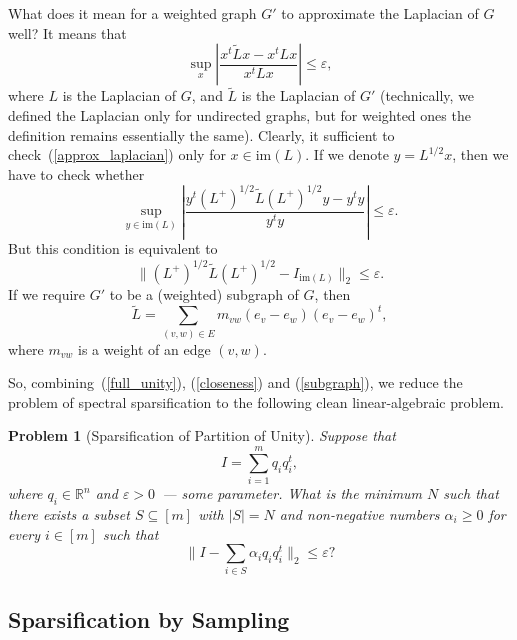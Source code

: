 \documentclass[12pt]{article}
\newcommand{\eps}{\varepsilon}
\newtheorem{problem}{Problem}
\begin{document}
    What does it mean for a weighted graph $G'$ to approximate the Laplacian of $G$ well?
    It means that
    \begin{equation}
        \label{approx_laplacian}
        \sup_x \left|\frac{x^t \tilde{L} x - x^t L x}{x^t L x}\right|\leq \eps,
    \end{equation}
    where $L$ is the Laplacian of $G$, and $\tilde{L}$ is the Laplacian of $G'$
    (technically, we defined the Laplacian only for undirected graphs, but for weighted
    ones the definition remains essentially the same).
    Clearly, it sufficient to check~(\ref{approx_laplacian}) only for
    $x \in \mathrm{im}(L)$.
    If we denote $y = L^{1/2} x$, then we have to check whether
    $$
        \sup_{y \in \mathrm{im}(L)} \left|\frac{y^t (L^+)^{1/2}
            \tilde{L} (L^+)^{1/2} y - y^t y}{y^t y}\right| \leq \eps.
    $$
    But this condition is equivalent to
    \begin{equation}
        \label{closeness}
        \|(L^+)^{1/2} \tilde{L} (L^+)^{1/2} - I_{\mathrm{im}(L)}\|_2 \leq \eps.
    \end{equation}
    If we require $G'$ to be a (weighted) subgraph of $G$, then
    \begin{equation}
        \label{subgraph}
        \tilde{L} = \sum_{(v,w)\in E} m_{vw} (e_v - e_w) (e_v - e_w)^t,
    \end{equation}
    where $m_{vw}$ is a weight of an edge $(v, w)$.

    So, combining~(\ref{full_unity}), (\ref{closeness}) and (\ref{subgraph}),
    we reduce the problem of spectral sparsification to the following clean
    linear-algebraic problem.

    \begin{problem}[Sparsification of Partition of Unity]
        \label{spu}
        Suppose that
        $$
            I = \sum_{i=1}^m q_i q_i^t,
        $$
        where $q_i \in \mathbb{R}^n$
        and $\eps > 0$~--- some parameter.
        What is the minimum $N$ such that there exists a subset $S \subseteq [m]$ with
        $|S| = N$ and non-negative numbers $\alpha_i \geq 0$ for every $i \in [m]$ such that
        $$
            \|I - \sum_{i \in S} \alpha_i q_i q_i^t\|_2 \leq \eps?
        $$
    \end{problem}

    \subsection{Sparsification by Sampling}
\end{document}
